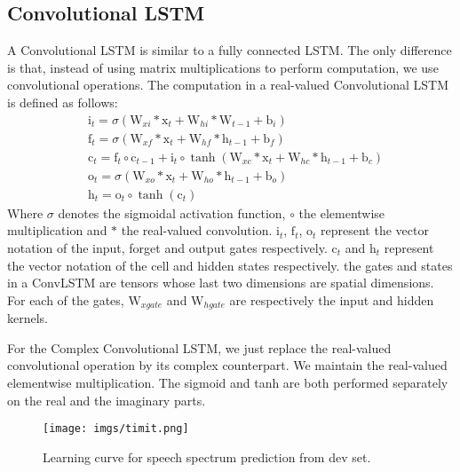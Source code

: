 \documentclass{article}
\begin{document}
\subsection{Convolutional LSTM}\label{convlstm}
A Convolutional LSTM is similar to a fully connected LSTM. The only difference is that, instead of using matrix multiplications to perform computation, we use convolutional operations. The computation in a real-valued Convolutional LSTM is defined as follows: 
\begin{equation}\label{chain_derivative}
\begin{aligned}
& \bm{\mathrm{i}}_t = \sigma(
\bm{\mathrm{W}}_{xi} * \bm{\mathrm{x}}_t + \bm{\mathrm{W}}_{hi} * \bm{\mathrm{W}}_{t-1} + \bm{\mathrm{b}}_i) \\
& \bm{\mathrm{f}}_t = \sigma(\bm{\mathrm{W}}_{xf} * \bm{\mathrm{x}}_t + \bm{\mathrm{W}}_{hf} * \bm{\mathrm{h}}_{t-1} + \bm{\mathrm{b}}_f) \\
& \bm{\mathrm{c}}_t = \bm{\mathrm{f}}_t \circ \bm{\mathrm{c}}_{t-1} + \bm{\mathrm{i}}_t \circ \tanh(\bm{\mathrm{W}}_{xc} * \bm{\mathrm{x}}_t + \bm{\mathrm{W}}_{hc} * \bm{\mathrm{h}}_{t-1} + \bm{\mathrm{b}}_c) \\
& \bm{\mathrm{o}}_t = \sigma(\bm{\mathrm{W}}_{xo} * \bm{\mathrm{x}}_t + \bm{\mathrm{W}}_{ho} * \bm{\mathrm{h}}_{t-1} + \bm{\mathrm{b}}_o) \\
& \bm{\mathrm{h}}_t = \bm{\mathrm{o}}_t \circ \tanh(\bm{\mathrm{c}}_t)
\end{aligned}
\end{equation}
Where $\sigma$ denotes the sigmoidal activation function, $\circ$ the elementwise multiplication and $*$ the real-valued convolution. $\bm{\mathrm{i}}_{t}$, $\bm{\mathrm{f}}_{t}$, $\bm{\mathrm{o}}_{t}$ represent the vector notation of the input, forget and output gates respectively. $\bm{\mathrm{c}}_{t}$ and $\bm{\mathrm{h}}_{t}$ represent the vector notation of the cell and hidden states respectively. the gates and states in a ConvLSTM are tensors whose last two dimensions are spatial dimensions. For each of the gates, $\bm{\mathrm{W}}_{xgate}$ and $\bm{\mathrm{W}}_{hgate}$ are respectively the input and hidden kernels.

For the Complex Convolutional LSTM, we just replace the real-valued convolutional operation by its complex counterpart. We maintain the real-valued elementwise multiplication. The sigmoid and tanh are both performed separately on the real and the imaginary parts.

\begin{figure}[h]
\centering
  \texttt{[image: imgs/timit.png]}
  \caption{Learning curve for speech spectrum prediction from dev set.}
  \label{fig:timit_learning}
\end{figure}
\end{document}
